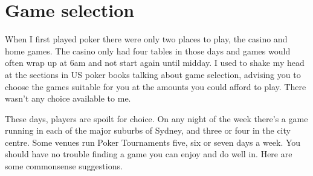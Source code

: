 \chapter{Game selection}


When I first played poker there were only two places to
play, the casino and home games. The casino only had four tables in
those days and games would often wrap up at 6am and not start again
until midday. I used to shake my head at the sections in US poker
books talking about game selection, advising you to choose the games
suitable for you at the amounts you could afford to play. There wasn't
any choice available to me.

These days, players are spoilt for choice. On any night
of the week there's a game running in each of
the major suburbs of Sydney, and three or four in
the city centre. Some venues run Poker Tournaments five, six or seven
days a week. You should have no trouble finding a game
you can enjoy and do well in. Here are some commonsense
suggestions.

